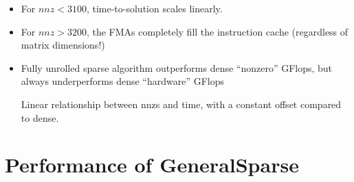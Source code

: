   \begin{itemize}
    \item For $nnz < 3100$, time-to-solution scales linearly.
    \item For $nnz > 3200$, the FMAs completely fill the instruction cache (regardless of matrix dimensions!)
    \item Fully unrolled sparse algorithm outperforms dense ``nonzero'' GFlops, but always underperforms dense ``hardware'' GFlops
    

    Linear relationship between nnzs and time, with a constant offset compared to dense.

  \end{itemize} 


\section{Performance of GeneralSparse}
\label{section:exp_jump_scaling}


